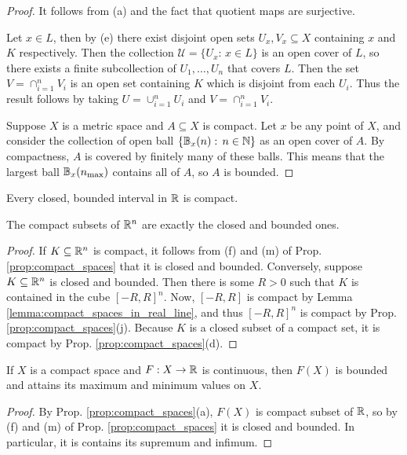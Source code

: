 \documentclass[11pt,a4paper]{article}
\begin{document}
\begin{proof}
 It follows from (a) and the fact that quotient maps are surjective.

 Let $x\in L$, then by (e) there exist disjoint open sets $U_x, V_x\subseteq X$ containing $x$ and $K$ respectively. Then the collection $\mathcal{U} = \{U_x:\,x\in L\}$ is an open cover of $L$, so there exists a finite subcollection of $U_1,\ldots,U_n$ that covers $L$. Then the set $V = \cap_{i=1}^n V_i$ is an open set containing $K$ which is disjoint from each $U_i$. Thus the result follows by taking $U = \cup_{i=1}^n U_i$ and $V = \cap_{i=1}^n V_i$.

 Suppose $X$ is a metric space and $A\subseteq X$ is compact. Let $x$ be any point of $X$, and consider the collection of open ball $\{\mathbb{B}_{x}(n):\,n\in\mathbb{N}\}$ as an open cover of $A$. By compactness, $A$ is covered by finitely many of these balls. This means that the largest ball $\mathbb{B}_{x}(n_{\text{max}})$ contains all of $A$, so $A$ is bounded.
\end{proof}

\begin{lemma}\label{lemma:compact_spaces_in_real_line}
Every closed, bounded interval in $\mathbb{R}$ is compact.
\end{lemma}

\begin{prop}
The compact subsets of $\mathbb{R}^n$ are exactly the closed and bounded ones.
\end{prop}

\begin{proof}
If $K\subseteq \mathbb{R}^n$ is compact, it follows from (f) and (m) of Prop. \ref{prop:compact_spaces} that it is closed and bounded. Conversely, suppose $K\subseteq \mathbb{R}^n$ is closed and bounded. Then there is some $R>0$ such that $K$ is contained in the cube $[-R,R]^n$. Now, $[-R,R]$ is compact by Lemma \ref{lemma:compact_spaces_in_real_line}, and thus $[-R,R]^n$ is compact by Prop. \ref{prop:compact_spaces}(j). Because $K$ is a closed subset of a compact set, it is compact by Prop. \ref{prop:compact_spaces}(d).
\end{proof}

\begin{prop}
If $X$ is a compact space and $F:X\rightarrow \mathbb{R}$ is continuous, then $F(X)$ is bounded and attains its maximum and minimum values on $X$.
\end{prop}

\begin{proof}
By Prop. \ref{prop:compact_spaces}(a), $F(X)$ is compact subset of $\mathbb{R}$, so by (f) and (m) of Prop. \ref{prop:compact_spaces} it is closed and bounded. In particular, it is contains its supremum and infimum.
\end{proof}
\end{document}
